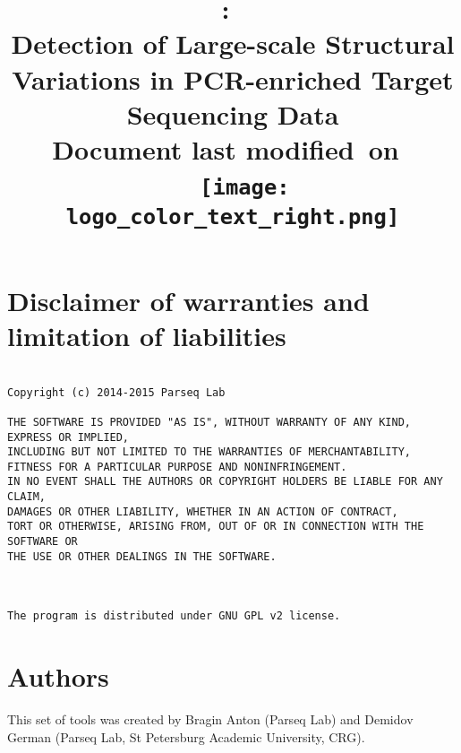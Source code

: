 \documentclass{article}
\title{
\vspace{2in}
\textmd{\LARGE{\textbf{\hmwkClass:\ \hmwkTitle}}}\\
\vspace{0.1in}\Large{Detection of Large-scale Structural Variations in PCR-enriched Target Sequencing Data}\\
\normalsize\vspace{0.1in}\small{Document last modified\ on\ \hmwkDueDate}\\
\vspace{0.1in}\small{{\hmwkClassInstructor\ \hmwkClassTime}}
\vspace{3in}
\vfill
\texttt{[image: logo\_color\_text\_right.png]}
}
\author{\textbf{\hmwkAuthorName}}
\date{} %
\begin{document}
\clearpage\maketitle
\thispagestyle{empty}



\newpage
\tableofcontents
\newpage



\section{Disclaimer of warranties and limitation of liabilities}

\begin{small}
\begin{verbatim}

Copyright (c) 2014-2015 Parseq Lab

THE SOFTWARE IS PROVIDED "AS IS", WITHOUT WARRANTY OF ANY KIND, EXPRESS OR IMPLIED, 
INCLUDING BUT NOT LIMITED TO THE WARRANTIES OF MERCHANTABILITY, 
FITNESS FOR A PARTICULAR PURPOSE AND NONINFRINGEMENT. 
IN NO EVENT SHALL THE AUTHORS OR COPYRIGHT HOLDERS BE LIABLE FOR ANY CLAIM, 
DAMAGES OR OTHER LIABILITY, WHETHER IN AN ACTION OF CONTRACT, 
TORT OR OTHERWISE, ARISING FROM, OUT OF OR IN CONNECTION WITH THE SOFTWARE OR
THE USE OR OTHER DEALINGS IN THE SOFTWARE.



The program is distributed under GNU GPL v2 license.
\end{verbatim}
\end{small}

\newpage


\section{Authors}

This set of tools was created by Bragin Anton (Parseq Lab) and Demidov German (Parseq Lab, St Petersburg Academic University, CRG).
\end{document}
